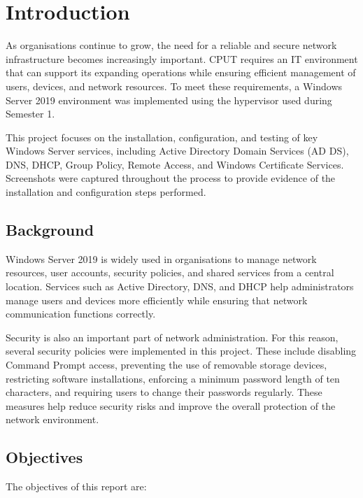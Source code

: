 \chapter{Introduction}

As organisations continue to grow, the need for a reliable and secure network infrastructure becomes increasingly important. CPUT requires an IT environment that can support its expanding operations while ensuring efficient management of users, devices, and network resources. To meet these requirements, a Windows Server 2019 environment was implemented using the hypervisor used during Semester 1.

This project focuses on the installation, configuration, and testing of key Windows Server services, including Active Directory Domain Services (AD DS), DNS, DHCP, Group Policy, Remote Access, and Windows Certificate Services. Screenshots were captured throughout the process to provide evidence of the installation and configuration steps performed.

\section{Background}

Windows Server 2019 is widely used in organisations to manage network resources, user accounts, security policies, and shared services from a central location. Services such as Active Directory, DNS, and DHCP help administrators manage users and devices more efficiently while ensuring that network communication functions correctly.

Security is also an important part of network administration. For this reason, several security policies were implemented in this project. These include disabling Command Prompt access, preventing the use of removable storage devices, restricting software installations, enforcing a minimum password length of ten characters, and requiring users to change their passwords regularly. These measures help reduce security risks and improve the overall protection of the network environment.

\section{Objectives}

The objectives of this report are:


